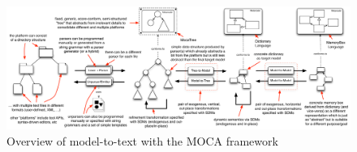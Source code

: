 \begin{figure}[htp]
\begin{center}
 \includegraphics[angle=90, height=\textheight]{pics/moca/text-to-model}
  \caption{Overview of model-to-text with the MOCA framework}
  \label{fig:moca-overview}
\end{center}
\end{figure} 


\clearpage



 
 


%

%
 
